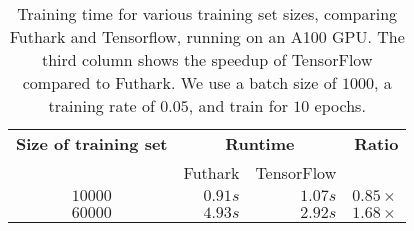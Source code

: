 \begin{table}
\begin{tabular}{crrr}
\textbf{Size of training set} & \multicolumn{2}{c}{\textbf{Runtime}} & \textbf{Ratio} \\
& Futhark & TensorFlow & \\
$10000$ & $0.91s$ & $1.07s$ & $0.85\times{}$ \\
$60000$ & $4.93s$ & $2.92s$ & $1.68\times{}$
\end{tabular}
\caption{Training time for various training set sizes, comparing
  Futhark and Tensorflow, running on an A100 GPU. The third column
  shows the speedup of TensorFlow compared to Futhark. We use a batch
  size of $1000$, a training rate of $0.05$, and train for $10$
  epochs.}
\label{tab:performance}
\end{table}

%
